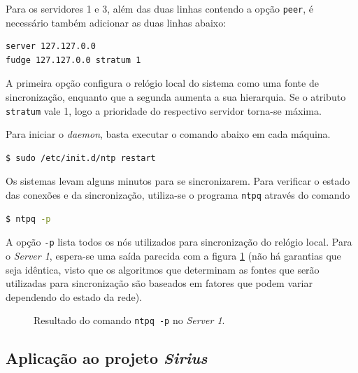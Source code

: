 \vspace{12pt}

Para os servidores 1 e 3, além das duas linhas contendo a opção \texttt{peer}, é
necessário também adicionar as duas linhas abaixo:

\begin{lstlisting}[language=bash, style=nonumbers]
server 127.127.0.0
fudge 127.127.0.0 stratum 1
\end{lstlisting}

A primeira opção configura o relógio local do sistema como uma fonte de
sincronização, enquanto que a segunda aumenta a sua hierarquia. Se o
atributo \texttt{stratum} vale 1, logo a prioridade do respectivo servidor
torna-se máxima.

\vspace{12pt}

Para iniciar o \textit{daemon}, basta executar o comando abaixo em cada máquina.

\begin{lstlisting}[language=bash, style=nonumbers]
$ sudo /etc/init.d/ntp restart
\end{lstlisting}

Os sistemas levam alguns minutos para se sincronizarem. Para verificar o estado
das conexões e da sincronização, utiliza-se o programa \texttt{ntpq} através do
comando 

\begin{lstlisting}[language=bash, style=nonumbers]
$ ntpq -p
\end{lstlisting}

A opção \texttt{-p} lista todos os nós utilizados para sincronização do relógio
local. Para o \textit{Server 1}, espera-se uma saída parecida com a figura
\ref{fig:sv1} (não há garantias que seja idêntica, visto que os algoritmos que
determinam as fontes que serão utilizadas para sincronização são baseados em
fatores que podem variar dependendo do estado da rede). 

\FloatBarrier

\begin{figure}[h]
    
    \centering
    \caption {Resultado do comando \texttt{ntpq -p} no \textit{Server 1}.}
    \label{fig:sv1} 
\end{figure} 

\FloatBarrier
\subsection {Aplicação ao projeto \textit{Sirius}}